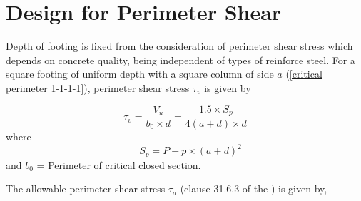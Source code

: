 \section{Design for Perimeter Shear} Depth of footing is fixed from 
the consideration of perimeter shear stress which depends on concrete
quality, being independent of types of reinforce steel. For a square 
footing of uniform depth with a square column of side $a$
(\fig \ref{critical perimeter 1-1-1-1}), perimeter shear stress
$\tau_{v}$ is given by

\begin{equation}
\label{eq:perimeterShearStress}
\tau_{v} = \frac{V_{u}} {{b_{0}} \times d} 
=\frac{1.5 \times S_{p}} {4(a + d) \times d} 
\end{equation}
where 
\begin{equation}
\label{eq:perimeterShearForce}
\quad S_{p} = P - p \times (a + d)^2
\end{equation}
and $b_0$ = Perimeter of critical closed section.

The allowable perimeter shear stress ${\tau_{a}}$ (clause 31.6.3 of
the ) is given by,


